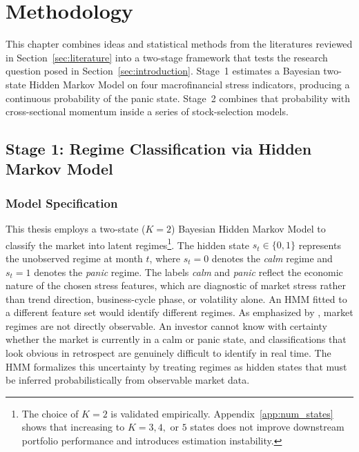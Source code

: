 \newpage
\section{Methodology}\label{sec:methodology}


This chapter combines ideas and statistical methods from the literatures reviewed in Section~\ref{sec:literature} into a two-stage framework that tests the research question posed in Section~\ref{sec:introduction}. Stage~1 estimates a Bayesian two-state Hidden Markov Model on four macrofinancial stress indicators, producing a continuous probability of the panic state. Stage~2 combines that probability with cross-sectional momentum inside a series of stock-selection models.

\subsection{Stage 1: Regime Classification via Hidden Markov Model}\label{sec:stage1}

\subsubsection{Model Specification}\label{sec:hmm_spec}

This thesis employs a two-state ($K = 2$) Bayesian Hidden Markov Model to classify the market into latent regimes\footnote{The choice of $K = 2$ is validated empirically. Appendix~\ref{app:num_states} shows that increasing to $K = 3, 4,$ or $5$ states does not improve downstream portfolio performance and introduces estimation instability.}. The hidden state $s_t \in \{0, 1\}$ represents the unobserved regime at month $t$, where $s_t = 0$ denotes the \emph{calm} regime and $s_t = 1$ denotes the \emph{panic} regime. The labels \emph{calm} and \emph{panic} reflect the economic nature of the chosen stress features, which are diagnostic of market stress rather than trend direction, business-cycle phase, or volatility alone. An HMM fitted to a different feature set would identify different regimes. As emphasized by \citet{Hamilton1989}, market regimes are not directly observable. An investor cannot know with certainty whether the market is currently in a calm or panic state, and classifications that look obvious in retrospect are genuinely difficult to identify in real time. The HMM formalizes this uncertainty by treating regimes as hidden states that must be inferred probabilistically from observable market data.

